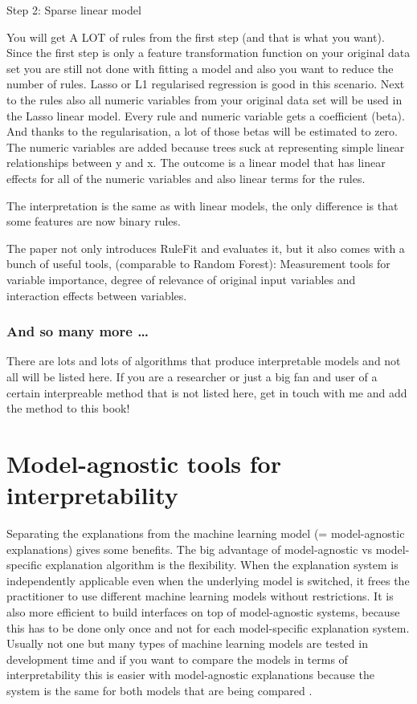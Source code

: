 \documentclass[12pt,]{krantz}
\theoremstyle{definition}
\theoremstyle{definition}
\theoremstyle{definition}
\theoremstyle{remark}
\begin{document}
Step 2: Sparse linear model

You will get A LOT of rules from the first step (and that is what you
want). Since the first step is only a feature transformation function on
your original data set you are still not done with fitting a model and
also you want to reduce the number of rules. Lasso or L1 regularised
regression is good in this scenario. Next to the rules also all numeric
variables from your original data set will be used in the Lasso linear
model. Every rule and numeric variable gets a coefficient (beta). And
thanks to the regularisation, a lot of those betas will be estimated to
zero. The numeric variables are added because trees suck at representing
simple linear relationships between y and x. The outcome is a linear
model that has linear effects for all of the numeric variables and also
linear terms for the rules.

The interpretation is the same as with linear models, the only
difference is that some features are now binary rules.

The paper not only introduces RuleFit and evaluates it, but it also
comes with a bunch of useful tools, (comparable to Random Forest):
Measurement tools for variable importance, degree of relevance of
original input variables and interaction effects between variables.

\subsection{And so many more \ldots{}}\label{and-so-many-more}

There are lots and lots of algorithms that produce interpretable models
and not all will be listed here. If you are a researcher or just a big
fan and user of a certain interpreable method that is not listed here,
get in touch with me and add the method to this book!

\chapter{Model-agnostic tools for interpretability}\label{agnostic}

Separating the explanations from the machine learning model (=
model-agnostic explanations) gives some benefits. The big advantage of
model-agnostic vs model-specific explanation algorithm is the
flexibility. When the explanation system is independently applicable
even when the underlying model is switched, it frees the practitioner to
use different machine learning models without restrictions. It is also
more efficient to build interfaces on top of model-agnostic systems,
because this has to be done only once and not for each model-specific
explanation system. Usually not one but many types of machine learning
models are tested in development time and if you want to compare the
models in terms of interpretability this is easier with model-agnostic
explanations because the system is the same for both models that are
being compared \citep{Ribeiro2016b}.
\end{document}
